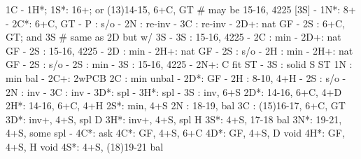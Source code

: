 1C - 1H*;
1S*: 16+; or (13)14-15, 6+C, GT  # may be 15-16, 4225 [3S]
   - 1N*: 8+
        - 2C*: 6+C, GT
             - P  : s/o
             - 2N : re-inv
             - 3C : re-inv
        - 2D+: nat GF
        - 2S : 6+C, GT; and 3S  # same as 2D but w/ 3S
        - 3S : 15-16, 4225
   - 2C : min
        - 2D+: nat GF
        - 2S : 15-16, 4225
   - 2D : min
        - 2H+: nat GF
        - 2S : s/o
   - 2H : min
        - 2H+: nat GF
        - 2S : s/o
   - 2S : min
        - 3S : 15-16, 4225
   - 2N+: C fit ST
   - 3S : solid S ST
1N : min bal
   - 2C+: 2wPCB
2C : min unbal
   - 2D*: GF
   - 2H : 8-10, 4+H
   - 2S : s/o
   - 2N : inv
   - 3C : inv
   - 3D*: spl
   - 3H*: spl
   - 3S : inv, 6+S
2D*: 14-16, 6+C, 4+D
2H*: 14-16, 6+C, 4+H 
2S*: min, 4+S
2N : 18-19, bal
3C : (15)16-17, 6+C, GT
3D*: inv+, 4+S, spl D
3H*: inv+, 4+S, spl H
3S*: 4+S, 17-18 bal
3N*: 19-21, 4+S, some spl
   - 4C*: ask
4C*: GF, 4+S, 6+C
4D*: GF, 4+S, D void 
4H*: GF, 4+S, H void 
4S*: 4+S, (18)19-21 bal